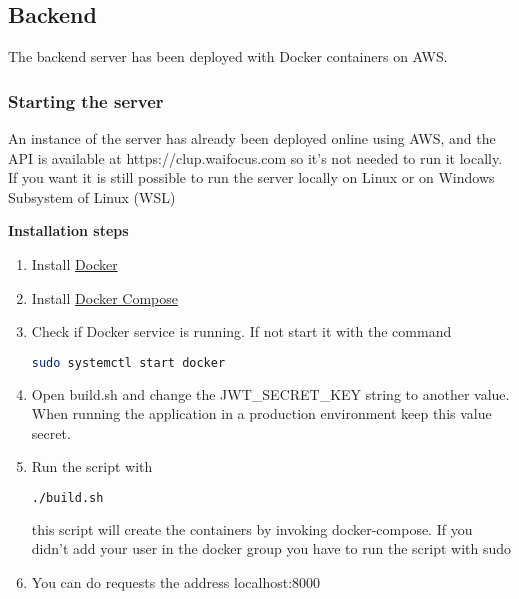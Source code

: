\subsection{Backend}
The backend server has been deployed with Docker containers on AWS.



\subsubsection{Starting the server}
An instance of the server has already been deployed online using AWS, and the API is available at https://clup.waifocus.com so it's not needed to run it locally.
If you want it is still possible to run the server locally on Linux or on Windows Subsystem of Linux (WSL)

\textbf{Installation steps}
\begin{enumerate}
    \item Install \href{https://docs.docker.com/get-docker/}{Docker}
    \item Install \href{https://docs.docker.com/compose/install/}{Docker Compose}
    \item Check if Docker service is running. If not start it with the command
          \begin{lstlisting}[language=bash]
    sudo systemctl start docker
    \end{lstlisting}
    \item  Open build.sh and change the JWT\_SECRET\_KEY string to another value. When running the application in a production environment keep this value secret.
    \item Run the script with
          \begin{lstlisting}[language=bash]
    ./build.sh
    \end{lstlisting}
          this script will create the containers by invoking docker-compose. If you didn't add your user in the docker group
          you have to run the script with sudo
    \item You can do requests the address localhost:8000
\end{enumerate}

\clearpage

